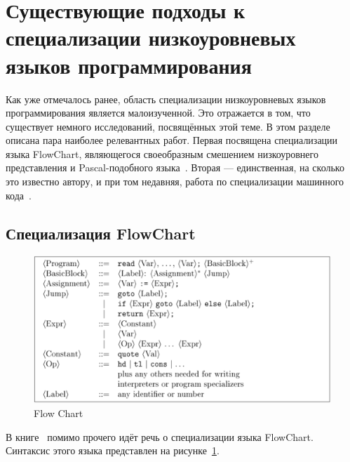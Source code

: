 \section{Существующие подходы к специализации низкоуровневых языков программирования}

Как уже отмечалось ранее, область специализации низкоуровневых языков программирования является малоизученной.
Это отражается в том, что существует немного исследований, посвящённых этой теме.
В этом разделе описана пара наиболее релевантных работ.
Первая посвящена специализации языка \textsf{FlowChart}, являющегося своеобразным смешением низкоуровнего
представления и \textsf{Pascal}-подобного языка~\cite{PEAPG}.
Вторая --- единственная, на сколько это известно автору, и при том недавняя,
работа по специализации машинного кода~\cite{PEMC}.

\subsection{Специализация \textsf{FlowChart}}

\begin{figure}[t]
\includegraphics[width=\linewidth]{Kravchenko/Pic1.png}
\caption{Flow Chart\protect\footnotemark}
\label{fig:flow}
\end{figure}


В  книге~\cite{PEAPG} помимо прочего идёт речь о специализации языка \textsf{FlowChart}. Синтаксис этого языка представлен на рисунке~\ref{fig:flow}.

